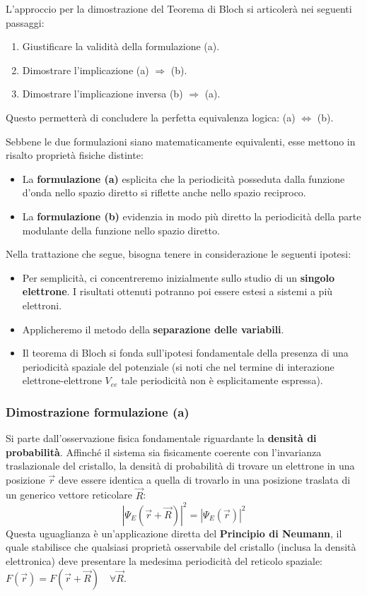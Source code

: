 L'approccio per la dimostrazione del Teorema di Bloch si articolerà nei seguenti passaggi:
\begin{enumerate}
    \item Giustificare la validità della formulazione (a).
    \item Dimostrare l'implicazione (a) \(\Rightarrow\) (b).
    \item Dimostrare l'implicazione inversa (b) \(\Rightarrow\) (a).
\end{enumerate}
Questo permetterà di concludere la perfetta equivalenza logica: (a) \(\Leftrightarrow\) (b).

Sebbene le due formulazioni siano matematicamente equivalenti, esse mettono in risalto proprietà fisiche distinte:
\begin{itemize}
    \item La \textbf{formulazione (a)} esplicita che la periodicità posseduta dalla funzione d'onda nello spazio diretto si riflette anche nello spazio reciproco.
    \item La \textbf{formulazione (b)} evidenzia in modo più diretto la periodicità della parte modulante della funzione nello spazio diretto.
\end{itemize}

\begin{remark}
    Nella trattazione che segue, bisogna tenere in considerazione le seguenti ipotesi:
\begin{itemize}
    \item Per semplicità, ci concentreremo inizialmente sullo studio di un \textbf{singolo elettrone}. I risultati ottenuti potranno poi essere estesi a sistemi a più elettroni.
    \item Applicheremo il metodo della \textbf{separazione delle variabili}.
    \item Il teorema di Bloch si fonda sull'ipotesi fondamentale della presenza di una periodicità spaziale del potenziale (si noti che nel termine di interazione elettrone-elettrone \(V_{ee}\) tale periodicità non è esplicitamente espressa).
\end{itemize}
\end{remark}

\subsubsection{Dimostrazione formulazione (a)}
Si parte dall'osservazione fisica fondamentale riguardante la \textbf{densità di probabilità}. Affinché il sistema sia fisicamente coerente con l'invarianza traslazionale del cristallo, la densità di probabilità di trovare un elettrone in una posizione \(\vec{r}\) deve essere identica a quella di trovarlo in una posizione traslata di un generico vettore reticolare \(\vec{R}\):
\begin{equation}
    |\Psi_E(\vec{r} + \vec{R})|^2 = |\Psi_E(\vec{r})|^2
\end{equation}
Questa uguaglianza è un'applicazione diretta del \textbf{Principio di Neumann}, il quale stabilisce che qualsiasi proprietà osservabile del cristallo (inclusa la densità elettronica) deve presentare la medesima periodicità del reticolo spaziale: \(F(\vec{r}) = F(\vec{r} + \vec{R}) \quad \forall \vec{R}\).

